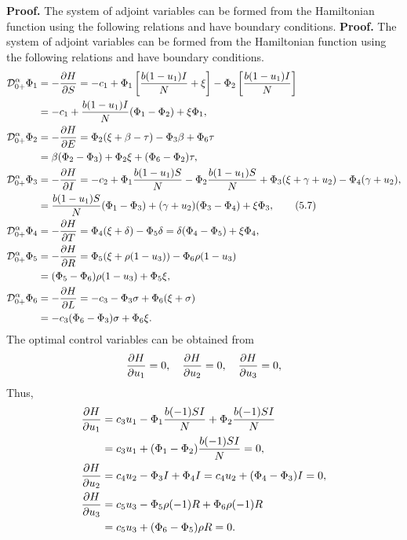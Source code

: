 \documentclass[10pt]{NSP1}
\newcommand{\CD}{\mathcal{D}}
\begin{document}
	\textbf{Proof.} The system of adjoint variables can be formed from the Hamiltonian function using the following relations and have boundary conditions.
	\textbf{Proof.} The system of adjoint variables can be formed from the Hamiltonian function using the following relations and have boundary conditions.
	\begin{align}
		\CD_{0+}^{\alpha} \Phi_1 &= -\frac{\partial H}{\partial S} = -c_1 + \Phi_1 \left[ \frac{b (1-u_1) I}{N} + \xi \right] - \Phi_2 \left[ \frac{b (1-u_1) I}{N} \right] \notag \\
		&= -c_1 + \frac{b (1-u_1) I}{N} (\Phi_1 - \Phi_2) + \xi \Phi_1, \notag\\
		\CD_{0+}^{\alpha} \Phi_2 &= -\frac{\partial H}{\partial E} = \Phi_2 (\xi + \beta - \tau) - \Phi_3 \beta + \Phi_6 \tau \notag \notag\\
		&= \beta(\Phi_2 - \Phi_3) + \Phi_2 \xi + (\Phi_6 - \Phi_2) \tau, \notag\\
		\CD_{0+}^{\alpha} \Phi_3 &= -\frac{\partial H}{\partial I} = -c_2 + \Phi_1 \frac{b (1-u_1) S}{N} - \Phi_2 \frac{b (1-u_1) S}{N} + \Phi_3 (\xi + \gamma + u_2) - \Phi_4 (\gamma + u_2), \notag \\
		&= \frac{b (1-u_1) S}{N} (\Phi_1 - \Phi_3) + (\gamma + u_2)(\Phi_3 - \Phi_4) + \xi \Phi_3, \tag{5.7} \\
		\CD_{0+}^{\alpha} \Phi_4 &= -\frac{\partial H}{\partial T} = \Phi_4 (\xi + \delta) - \Phi_5 \delta = \delta(\Phi_4 - \Phi_5) + \xi \Phi_4, \notag \\
		\CD_{0+}^{\alpha} \Phi_5 &= -\frac{\partial H}{\partial R} = \Phi_5 (\xi + \rho(1-u_3)) - \Phi_6 \rho(1-u_3) \notag \\
		&= (\Phi_5 - \Phi_6) \rho(1-u_3) + \Phi_5 \xi, \notag \\
		\CD_{0+}^{\alpha} \Phi_6 &= -\frac{\partial H}{\partial L} = -c_3 - \Phi_3 \sigma + \Phi_6 (\xi + \sigma) \notag \\
		&= -c_3 (\Phi_6 - \Phi_3) \sigma + \Phi_6 \xi. \notag
	\end{align}
	The optimal control variables can be obtained from
	\begin{equation}
		\frac{\partial H}{\partial u_1} = 0, \quad \frac{\partial H}{\partial u_2} = 0, \quad \frac{\partial H}{\partial u_3} = 0,\notag
	\end{equation}
	Thus,
	\begin{align}
		\frac{\partial H}{\partial u_1} &= c_3 u_1 - \Phi_1 \frac{b (-1) S I}{N} + \Phi_2 \frac{b (-1) S I}{N} \notag \\
		&= c_3 u_1 + (\Phi_1 - \Phi_2) \frac{b (-1) S I}{N} = 0, \notag \\
		\frac{\partial H}{\partial u_2} &= c_4 u_2 - \Phi_3 I + \Phi_4 I = c_4 u_2 + (\Phi_4 - \Phi_3) I = 0, \notag \\
		\frac{\partial H}{\partial u_3} &= c_5 u_3 - \Phi_5 \rho(-1) R + \Phi_6 \rho(-1) R \notag \\
		&= c_5 u_3 + (\Phi_6 - \Phi_5) \rho R = 0. \notag
	\end{align}
\end{document}
